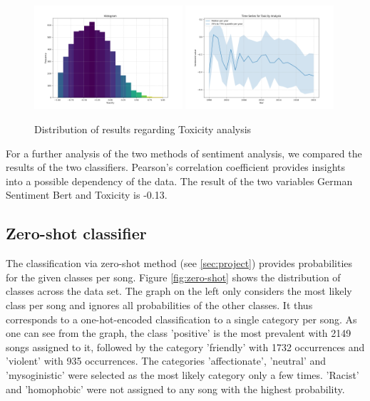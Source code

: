 \begin{figure}[!htb]
    \centering
    \includegraphics[width=0.49\textwidth]{figures/toxicity_histogram.png}
    \includegraphics[width=0.49\textwidth]{figures/time_series_toxicity.png}
    \caption{Distribution of results regarding Toxicity analysis}
    \label{fig:toxicity}
\end{figure}

For a further analysis of the two methods of sentiment analysis, we compared the results of the two classifiers. Pearson's correlation coefficient provides insights into a possible dependency of the data. The result of the two variables German Sentiment Bert and Toxicity is -0.13.



\subsection*{Zero-shot classifier}

The classification via zero-shot method (see \autoref{sec:project}) provides probabilities for the given classes per song. Figure \autoref{fig:zero-shot} shows the distribution of classes across the data set. The graph on the left only considers the most likely class per song and ignores all probabilities of the other classes. It thus corresponds to a one-hot-encoded classification to a single category per song. As one can see from the graph, the class 'positive' is the most prevalent with 2149 songs assigned to it, followed by the category 'friendly' with 1732 occurrences and 'violent' with 935 occurrences. The categories 'affectionate', 'neutral' and 'mysoginistic' were selected as the most likely category only a few times. 'Racist' and 'homophobic' were not assigned to any song with the highest probability.

